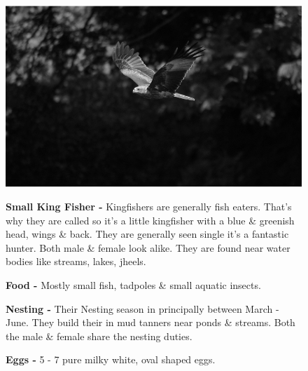 \begin{figure}[H]
\begin{center}
\includegraphics{figure/Land_birds/01_pariah_kite/pariah-kite.eps}
\end{center}
\medskip
\noindent
{\bf Small King Fisher -} Kingfishers are generally fish eaters. That's why they are called so it's a little kingfisher with a blue \& greenish head, wings \& back. They are generally seen single it's a fantastic hunter. Both male \& female look alike. They are found near water bodies like streams, lakes, jheels.

\medskip
{\bf Food -} Mostly small fish, tadpoles \& small aquatic insects.

{\bf Nesting -} Their Nesting season in principally between March - June. They build their in mud tanners near ponds \& streams. Both the male \& female share the nesting duties.

{\bf Eggs -} 5 - 7 pure milky white, oval shaped eggs.
\end{figure}

\vfill\eject

~\phantom{a}
\vfill

